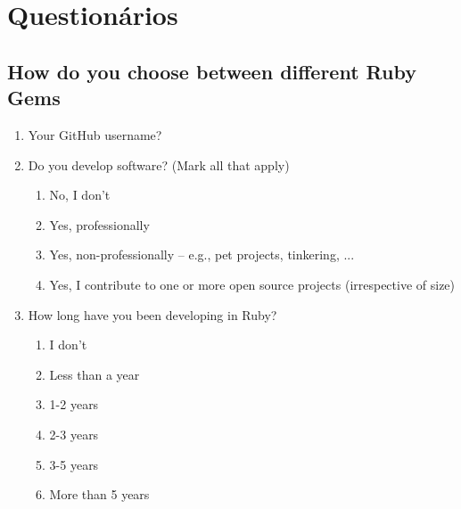 \appendix
\chapter{Questionários}

\section{How do you choose between different Ruby Gems}

\begin{enumerate}
  \item \hspace{1pt} Your GitHub username?

  \item \hspace{1pt} Do you develop software? (Mark all that apply)
  \begin{enumerate}
	\item \hspace{1pt} No, I don't
    \item \hspace{1pt} Yes, professionally
    \item \hspace{1pt} Yes, non-professionally -- e.g., pet projects, tinkering, ...
    \item \hspace{1pt} Yes, I contribute to one or more open source projects (irrespective of size)
  \end{enumerate}

  \item \hspace{1pt} How long have you been developing in Ruby?
    \begin{enumerate}
      \item \hspace{1pt} I don't
      \item \hspace{1pt} Less than a year
      \item \hspace{1pt} 1-2 years
      \item \hspace{1pt} 2-3 years
      \item \hspace{1pt} 3-5 years
      \item \hspace{1pt} More than 5 years
    \end{enumerate}


\end{enumerate}
